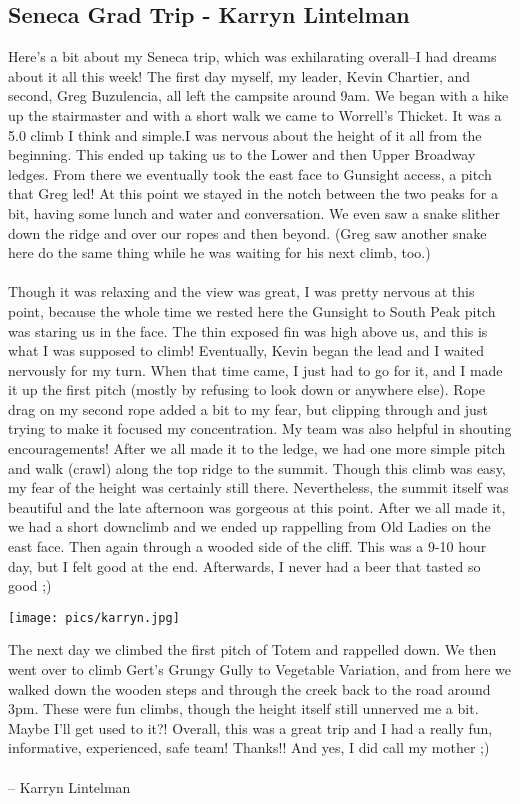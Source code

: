 \documentclass[10pt,a4paper]{article}
\newcommand\subsect[1]{%
  \subsection*{#1}%
  \addcontentsline{toc}{subsection}{#1}}
\newenvironment{Figure}
  {\par\medskip\noindent\minipage{\linewidth}}
  {\endminipage\par\medskip}
\begin{document}
\begin{multicols}{2}
\subsect{Seneca Grad Trip - Karryn Lintelman}
Here's a bit about my Seneca trip, which was exhilarating overall--I had dreams about it all this week!  The first day myself, my leader, Kevin Chartier, and second, Greg Buzulencia, all left the campsite around 9am.  We began with a hike up the stairmaster and with a short walk we came to Worrell's Thicket. It was a 5.0 climb I think and simple.I was nervous about the height of it all from the beginning.  This ended up taking us to the Lower and then Upper Broadway ledges. From there we eventually took the east face to Gunsight access, a pitch that Greg led!  At this point we stayed in the notch between the two peaks for a bit, having some lunch and water and conversation.  We even saw a snake slither down the ridge and over our ropes and then beyond.  (Greg saw another snake here do the same thing while he was waiting for his next climb, too.)  
\\
\\
Though it was relaxing and the view was great, I was pretty nervous at this point, because the whole time we rested here the Gunsight to South Peak pitch was staring us in the face.  The thin exposed fin was high above us, and this is what I was supposed to climb!  Eventually, Kevin began the lead and I waited nervously for my turn.  When that time came, I just had to go for it, and I made it up the first pitch (mostly by refusing to look down or anywhere else).  Rope drag on my second rope added a bit to my fear, but clipping through and just trying to make it focused my concentration.  My team was also helpful in shouting encouragements!  After we all made it to the ledge, we had one more simple pitch and walk (crawl) along the top ridge to the summit.  Though this climb was easy, my fear of the height was certainly still there. Nevertheless, the summit itself was beautiful and the late afternoon was gorgeous at this point.  After we all made it, we had a short downclimb and we ended up rappelling from Old Ladies on the east face. Then again through a wooded side of the cliff.  This was a 9-10 hour day, but I felt good at the end.  Afterwards, I never had a beer that tasted so good ;)  
\begin{Figure}
 \centering
 \texttt{[image: pics/karryn.jpg]}
\end{Figure}
The next day we climbed the first pitch of Totem and rappelled down.  We then went over to climb Gert's Grungy Gully to Vegetable Variation, and from here we walked down the wooden steps and through the creek back to the road around 3pm.  These were fun climbs, though the height itself still unnerved me a bit.  Maybe I'll get used to it?!  Overall, this was a great trip and I had a really fun, informative, experienced, safe team!  Thanks!! And yes, I did call my mother ;)
\\
\\
-- Karryn Lintelman


\end{multicols}
\end{document}
